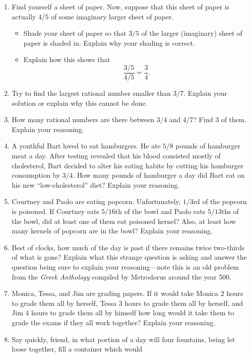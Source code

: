 \begin{problems}
\begin{enumerate}
\item Find yourself a sheet of paper. Now, suppose that this sheet of
  paper is actually $4/5$ of some imaginary larger sheet of
  paper. 
\begin{itemize}
\item Shade your sheet of paper so that $3/5$ of the larger
  (imaginary) sheet of paper is shaded in. Explain why your shading is
  correct.
\item Explain how this shows that 
\[
\frac{3/5}{4/5} = \frac{3}{4}.
\]
\end{itemize}
\item Try to find the largest rational number smaller than $3/7$.
  Explain your solution or explain why this cannot be done.
\item How many rational numbers are there between $3/4$ and $4/7$?
  Find $3$ of them. Explain your reasoning. 
\item A youthful Bart loved to eat hamburgers. He ate $5/8$ pounds of
  hamburger meat a day. After testing revealed that his blood
  consisted mostly of cholesterol, Bart decided to alter his eating
  habits by cutting his hamburger consumption by $3/4$. How many
  pounds of hamburger a day did Bart eat on his new
  ``low-cholesterol'' diet?  Explain your reasoning.
\item Courtney and Paolo are eating popcorn. Unfortunately, $1/3$rd of
  the popcorn is poisoned. If Courtney eats $5/16$th of the bowl and
  Paolo eats $5/13$ths of the bowl, did at least one of them eat
  poisoned kernel? Also, at least how many kernels of popcorn are in
  the bowl? Explain your reasoning.
\item Best of clocks, how much of the day is past if there remains
  twice two-thirds of what is gone? Explain what this strange question
  is asking and answer the question being sure to explain your
  reasoning---note this is an old problem from the \textit{Greek
    Anthology} compiled by Metrodorus around the year 500.
\item Monica, Tessa, and Jim are grading papers. If it would take
  Monica $2$ hours to grade them all by herself, Tessa $3$ hours to
  grade them all by herself, and Jim $4$ hours to grade them all by
  himself how long would it take them to grade the exams if they all
  work together? Explain your reasoning.
\item Say quickly, friend, in what portion of a day will four
  fountains, being let loose together, fill a container which would

\end{enumerate}
\end{problems}

